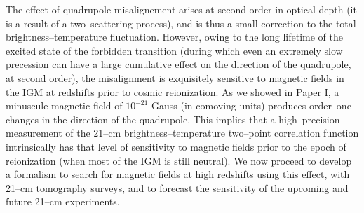 The effect of quadrupole misalignement arises at second order in optical depth (it is a result of a two--scattering process), and is thus a small correction to the total brightness--temperature fluctuation. However, owing to the long lifetime of the excited state of the forbidden transition (during which even an extremely slow precession can have a large cumulative effect on the direction of the quadrupole, at second order), the misalignment is exquisitely sensitive to magnetic fields in the IGM at redshifts prior to cosmic reionization. As we showed in Paper I, a minuscule magnetic field of  $10^{-21}$ Gauss (in comoving units) produces order--one changes in the direction of the quadrupole. This implies that a high--precision measurement of the 21--cm brightness--temperature two--point correlation function intrinsically has that level of sensitivity to magnetic fields prior to the epoch of reionization (when most of the IGM is still neutral). We now proceed to develop a formalism to search for magnetic fields at high redshifts using this effect, with 21--cm tomography surveys, and to forecast the sensitivity of the upcoming and future 21--cm experiments. 